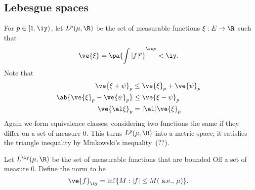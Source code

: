 
\subsection{Lebesgue spaces}

For $p\in [1,\iy)$, let
$L^p(\mu, \R)$ be the set of measurable functions $\xi: E\to \R$ such that
\[
\ve{\xi}=\pa{
\int |f|^p
}^{\rc p}<\iy.
\]
Note that
\begin{align*}
\ve{\xi+\psi}_p&\le \ve{\xi}_p+\ve{\psi}_p\\
\ab{\ve{\xi}_p-\ve{\psi}_p}&\le\ve{\xi-\psi}_p\\
\ve{\al \xi}_p&=|\al|\ve{\xi}_p
\end{align*}
Again we form equivalence classes, considering two functions the same if they differ on a set of measure 0. This turns $L^p(\mu, \R)$ into a metric space; it satisfies the triangle inequality by Minkowski's inequality~(??).

Let $L^{\iy}(\mu, \R)$ be the set of measurable functions that are bounded Off a set of measure 0. Define the norm to be 
\[
\ve{f}_{\iy} =\inf\{M:|f|\le M (\text{ a.e., }\mu)\}.
\]

